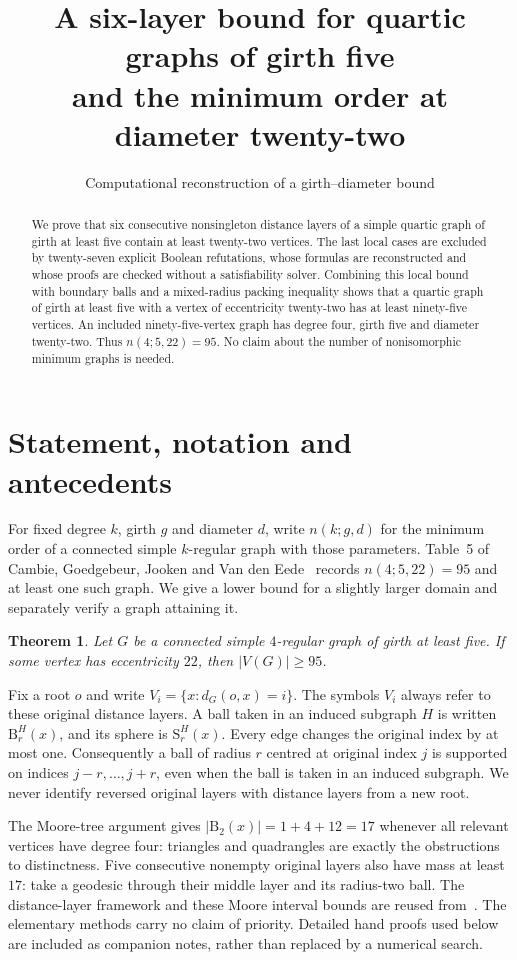 \documentclass[11pt]{article}
\title{A six-layer bound for quartic graphs of girth five\\and the minimum order at diameter twenty-two}
\author{Computational reconstruction of a girth--diameter bound}
\date{}
\newtheorem{theorem}{Theorem}
\newcommand{\B}{\mathrm B}
\newcommand{\Sph}{\mathrm S}
\begin{document}
\maketitle
\begin{abstract}
We prove that six consecutive nonsingleton distance layers of a simple
quartic graph of girth at least five contain at least twenty-two vertices.
The last local cases are excluded by twenty-seven explicit Boolean
refutations, whose formulas are reconstructed and whose proofs are checked
without a satisfiability solver. Combining this local bound with boundary
balls and a mixed-radius packing inequality shows that a quartic graph of
girth at least five with a vertex of eccentricity twenty-two has at least
ninety-five vertices. An included ninety-five-vertex graph has degree four,
girth five and diameter twenty-two. Thus $n(4;5,22)=95$. No claim about the
number of nonisomorphic minimum graphs is needed.
\end{abstract}

\section{Statement, notation and antecedents}

For fixed degree $k$, girth $g$ and diameter $d$, write $n(k;g,d)$ for the
minimum order of a connected simple $k$-regular graph with those parameters.
Table~5 of Cambie, Goedgebeur, Jooken and Van den Eede~\cite{source}
records $n(4;5,22)=95$ and at least one such graph. We give a lower bound
for a slightly larger domain and separately verify a graph attaining it.

\begin{theorem}\label{thm:main}
Let $G$ be a connected simple $4$-regular graph of girth at least five.
If some vertex has eccentricity $22$, then $|V(G)|\geq95$.
\end{theorem}

Fix a root $o$ and write $V_i=\{x:d_G(o,x)=i\}$. The symbols $V_i$ always
refer to these original distance layers. A ball taken in an induced
subgraph $H$ is written $\B_r^H(x)$, and its sphere is $\Sph_r^H(x)$.
Every edge changes the original index by at most one. Consequently a ball
of radius $r$ centred at original index $j$ is supported on indices
$j-r,\ldots,j+r$, even when the ball is taken in an induced subgraph.
We never identify reversed original layers with distance layers from a
new root.

The Moore-tree argument gives $|\B_2(x)|=1+4+12=17$ whenever all relevant
vertices have degree four: triangles and quadrangles are exactly the
obstructions to distinctness. Five consecutive nonempty original layers
also have mass at least $17$: take a geodesic through their middle layer
and its radius-two ball. The distance-layer framework and these Moore
interval bounds are reused from~\cite{source}. The elementary methods
carry no claim of priority. Detailed hand proofs used below are included
as companion notes, rather than replaced by a numerical search.
\end{document}
